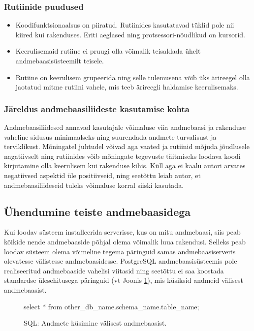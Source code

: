 \documentclass[a4paper,12pt]{article} %
\begin{document}
\subsubsection{Rutiinide puudused}
\begin{itemize}
\item Koodifunktsionaalsus on piiratud. Rutiinides kasutatavad tüklid pole nii kiired kui rakenduses. Eriti aeglased ning protsessori-nõudlikud on kursorid.
\item Keerulisemaid rutiine ei pruugi olla võimalik teisaldada ühelt andmebaasisüsteemilt teisele.
\item Rutiine on keerulisem grupeerida ning selle tulemusena võib üks ärireegel olla jaotatud mitme rutiini vahele, mis teeb ärireegli haldamise keerulisemaks.
\end{itemize}
\cite{StoredProcProsAndCons}

\subsubsection{Järeldus andmebaasiliideste kasutamise kohta}
Andmebaasiliidesed annavad kasutajale võimaluse viia andmebaasi ja rakenduse vaheline sidusus minimaalseks ning suurendada andmete turvalisust ja terviklikust. Mõningatel juhtudel võivad aga vaated ja rutiinid mõjuda jõudlusele nagatiivselt ning rutiinides võib mõningate tegevuste täitmiseks loodava koodi kirjutamine olla keerulisem kui rakenduse kihis. Küll aga ei kaalu autori arvates negatiivsed aspektid üle positiivseid, ning seetõttu leiab autor, et andmebaasiliideseid tuleks võimaluse korral siiski kasutada.

\subsection{Ühendumine teiste andmebaasidega}
Kui loodav süsteem installeerida serverisse, kus on mitu andmebaasi, siis  peab kõikide nende andmebaaside põhjal olema võimalik luua rakendusi. Selleks peab loodav süsteem olema võimeline tegema päringuid samas andmebaasiserveris olevatesse välistesse andmebaasidesse. PostgreSQL andmebaasisüsteemis pole realiseeritud andmebaaside vahelisi viitasid ning seetõttu ei saa koostada standardse ülesehitusega päringuid (vt Joonis \ref{fig_sql_andmete_küsimine_välisest_andmebaasist}), mis küsiksid andmeid välisest andmebaasist.
\begin{figure}[H]
\centering
\begin{SQL}
select * from other_db_name.schema_name.table_name;
\end{SQL}
\caption{SQL: Andmete küsimine välisest andmebaasist.}
\label{fig_sql_andmete_küsimine_välisest_andmebaasist}
\end{figure}
\end{document}
